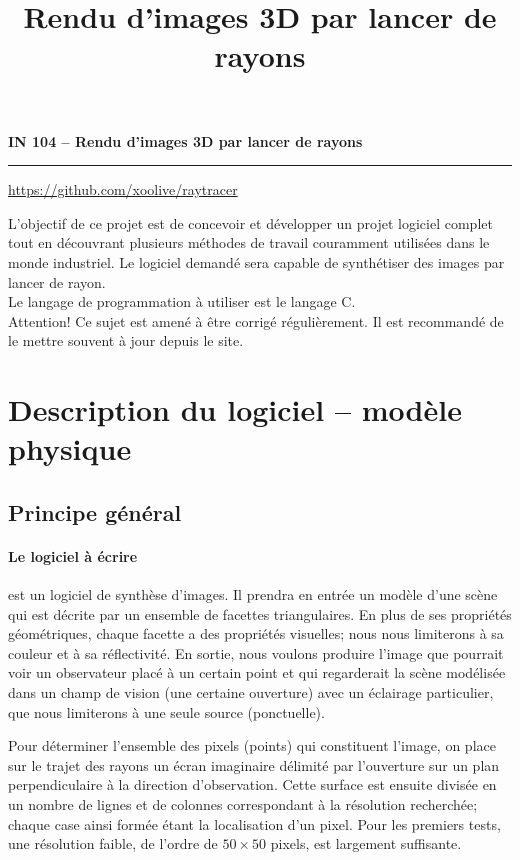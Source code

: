 \documentclass[10pt, a4paper ]{article}
\title{Rendu d'images 3D par lancer de rayons}
\begin{document}
\noindent
\textbf{\textsf{\large IN 104 -- Rendu d'images 3D par lancer de rayons }}
\vskip1mm\hrule\url{https://github.com/xoolive/raytracer}


\begin{minipage}{.9\textwidth} \sf L'objectif de ce projet est de concevoir et
    développer un projet logiciel complet tout en découvrant plusieurs méthodes
    de travail couramment utilisées dans le monde industriel. Le logiciel
    demandé sera capable de synthétiser des images par lancer de rayon.\\ Le
    langage de programmation à utiliser est le langage C. \\[5mm]
    {\color{BrickRed} Attention!} \hspace{5mm} Ce sujet est amené à être corrigé
    régulièrement. Il est recommandé de le mettre souvent à jour  depuis le
    site.\end{minipage}


\section{Description du logiciel -- modèle physique}
\subsection{Principe général}

\paragraph{Le logiciel à écrire} est un logiciel de synthèse d'images. Il
prendra en entrée un modèle d'une scène qui est décrite par un ensemble de
facettes triangulaires.  En plus de ses propriétés géométriques, chaque facette
a des propriétés visuelles; nous nous limiterons à sa couleur et à sa
réflectivité.  En sortie, nous voulons produire l'image que pourrait voir un
observateur placé à un certain point et qui regarderait la scène modélisée dans
un champ de vision (une certaine ouverture) avec un éclairage particulier, que
nous limiterons à une seule source (ponctuelle).

Pour déterminer l'ensemble des pixels (points) qui constituent l'image, on place
sur le trajet des rayons un écran imaginaire délimité par l'ouverture sur un
plan perpendiculaire à la direction d'observation. Cette surface est ensuite
divisée en un nombre de lignes et de colonnes correspondant à la résolution
recherchée; chaque case ainsi formée étant la localisation d'un pixel. Pour les
premiers tests, une résolution faible, de l'ordre de $50\times50$ pixels, est
largement suffisante.
\end{document}
